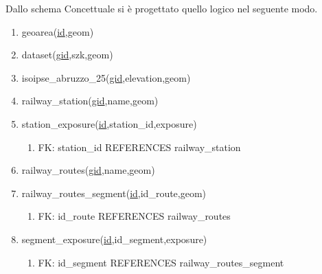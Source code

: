 Dallo schema Concettuale si è progettato quello logico nel seguente modo.

\begin{enumerate}
	\item geoarea(\underline{id},geom)
	\item dataset(\underline{gid},szk,geom) 
	\item isoipse\_abruzzo\_25(\underline{gid},elevation,geom)
	\item railway\_station(\underline{gid},name,geom)
	\item station\_exposure(\underline{id},station\_id,exposure)
	\begin{enumerate}
		\item FK: station\_id REFERENCES railway\_station  
	\end{enumerate}
	\item railway\_routes(\underline{gid},name,geom)
	\item railway\_routes\_segment(\underline{id},id\_route,geom)
	\begin{enumerate}
		\item FK: id\_route REFERENCES railway\_routes
	\end{enumerate}
	\item segment\_exposure(\underline{id},id\_segment,exposure)
	\begin{enumerate}
		\item FK: id\_segment REFERENCES railway\_routes\_segment
	\end{enumerate}
\end{enumerate}

